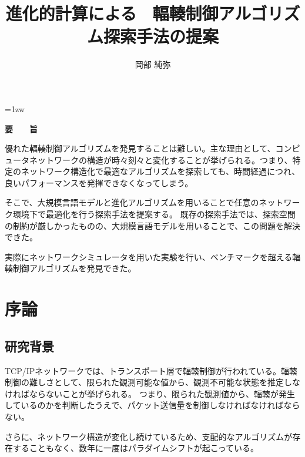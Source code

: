\documentclass[a4paper,11pt]{jreport}
\title{進化的計算による \ 輻輳制御アルゴリズム探索手法の提案}
\author{岡部 純弥}
\begin{document}
\maketitle
\thispagestyle{empty}
\newpage

\thispagestyle{empty}
\vspace*{20pt plus 1fil}
\parindent=1zw
\noindent
\begin{center}
{\Large \bf 要　　旨}
\vspace{2cm}
\end{center}

優れた輻輳制御アルゴリズムを発見することは難しい。主な理由として、コンピュータネットワークの構造が時々刻々と変化することが挙げられる。つまり、特定のネットワーク構造化で最適なアルゴリズムを探索しても、時間経過につれ、良いパフォーマンスを発揮できなくなってしまう。

そこで、大規模言語モデルと進化アルゴリズムを用いることで任意のネットワーク環境下で最適化を行う探索手法を提案する。
既存の探索手法では、探索空間の制約が厳しかったものの、大規模言語モデルを用いることで、この問題を解決できた。

実際にネットワークシミュレータを用いた実験を行い、ベンチマークを超える輻輳制御アルゴリズムを発見できた。

\par
\vspace{0pt plus 1fil}
\newpage

\tableofcontents
\listoffigures

\pagebreak \setcounter{page}{1}

\chapter{序論}

\section{研究背景}

TCP/IPネットワークでは、トランスポート層で輻輳制御が行われている。輻輳制御の難しさとして、限られた観測可能な値から、観測不可能な状態を推定しなければならないことが挙げられる。
つまり、限られた観測値から、輻輳が発生しているのかを判断したうえで、パケット送信量を制御しなければなければならない。

さらに、ネットワーク構造が変化し続けているため、支配的なアルゴリズムが存在することもなく、数年に一度はパラダイムシフトが起こっている。
\end{document}
